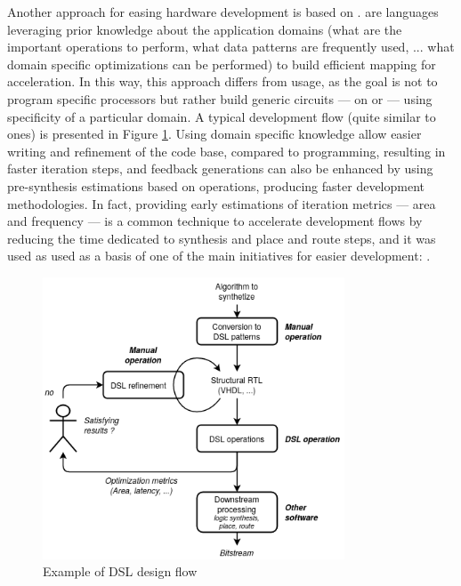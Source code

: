         \newpage
        Another approach for easing hardware development is based on .
         are languages leveraging prior knowledge about the application domains (what are the important operations to perform, what data patterns are frequently used, ... \ie what domain specific optimizations can be performed) to build efficient mapping for acceleration.
        In this way, this approach differs from  usage, as the goal is not to program specific processors but rather build generic circuits --- \eg on  or  --- using specificity of a particular domain.
        A typical  development flow (quite similar to  ones) is presented in Figure \ref{ch.problem:sec.hardware:ssec.paradigms:fig.dsl}. 
        Using domain specific knowledge allow easier writing and refinement of the  code base, compared to  programming, resulting in faster iteration steps, and feedback generations can also be enhanced by using pre-synthesis estimations based on  operations, producing faster development methodologies.
        In fact, providing early estimations of iteration metrics --- \eg area and frequency --- is a common technique to accelerate development flows by reducing the time dedicated to synthesis and place and route steps, and it was used as used as a basis of one of the main initiatives for easier development: .
        \begin{figure}[h!]
            \centering
            \includegraphics[width=0.8\textwidth]{Figures/DSL-flow.png}
            \caption{Example of DSL design flow}
            \label{ch.problem:sec.hardware:ssec.paradigms:fig.dsl}
        \end{figure}

